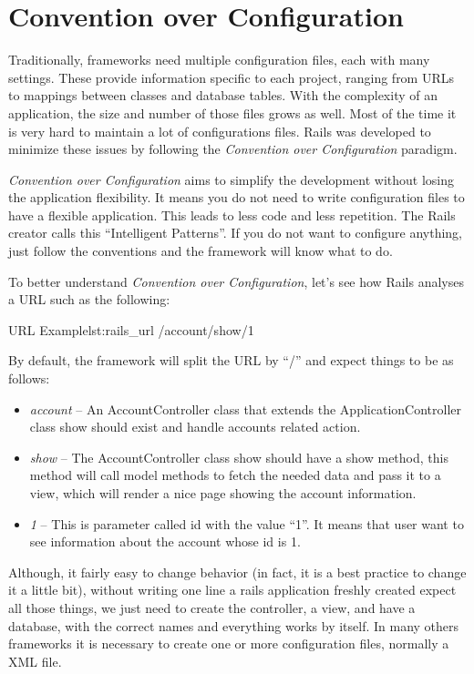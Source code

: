 \section{Convention over Configuration} 
Traditionally, frameworks need multiple configuration files, each with many settings. 
These provide information specific to each project, ranging from URLs to mappings between classes and database tables. 
With the complexity of an application, the size and number of those files grows as well. 
Most of the time it is very hard to maintain a lot of configurations files. 
Rails was developed to minimize these issues by following the \emph{Convention over Configuration} paradigm.

\emph{Convention over Configuration} aims to simplify the development without losing the application flexibility. 
It means you do not need to write configuration files to have a flexible application. 
This leads to less code and less repetition.
The Rails creator calls this “Intelligent Patterns”. 
If you do not want to configure anything, just follow the conventions and the framework will know what to do.

To better understand \emph{Convention over Configuration}, 
let's see how Rails analyses a URL such as the following:

\begin{rubycode}{URL Example}{lst:rails_url}
  /account/show/1

\end{rubycode}
By default, the framework will split the URL by “/” and expect things to be as follows: 

\begin{itemize}
\item \emph{account} – An AccountController class that extends the ApplicationController class show should exist and
handle accounts related action.
\item \emph{show} – The AccountController class show should have a show method, 
this method will call model methods to fetch the needed data and pass it to a view, 
which will render a nice page showing the account information.
\item \emph{1} – This is parameter called id with the value “1”. 
It means that user want to see information about the account whose id is 1. 
\end{itemize}

Although, it fairly easy to change behavior (in fact, it is a best practice to change it a little bit), 
without writing one line a rails application freshly created expect all those things, 
we just need to create the controller, a view, and have a database, with the correct names and everything works by itself. 
In many others frameworks it is necessary to create one or more configuration files, normally a XML file.

